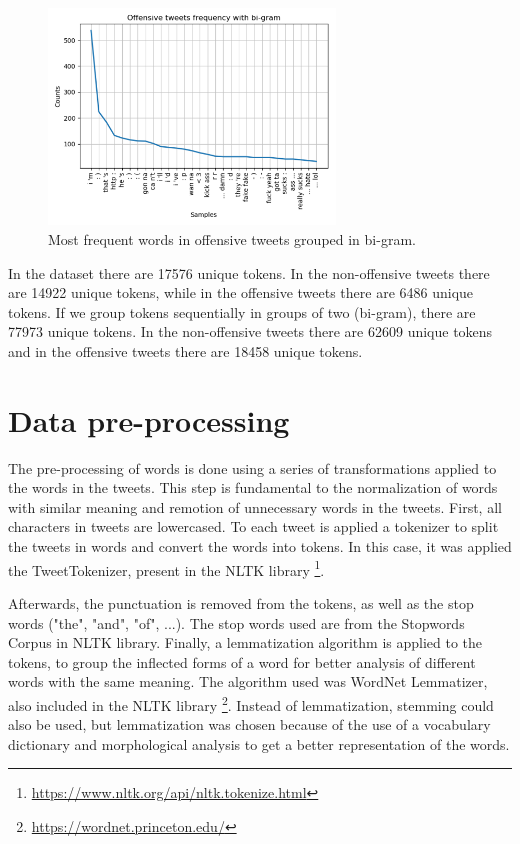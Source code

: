 \documentclass[journal]{IEEEtran}
\begin{document}
\begin{figure}[!t]
\centering
\includegraphics[width=3in]{offensive_tweets_bigram}
\caption{Most frequent words in offensive tweets grouped in bi-gram.}
\label{off_dataset_bigram}
\end{figure}

In the dataset there are 17576 unique tokens. In the non-offensive tweets there are 14922 unique tokens, while in the offensive tweets there are 6486 unique tokens. If we group tokens sequentially in groups of two (bi-gram), there are 77973 unique tokens. In the non-offensive tweets there are 62609 unique tokens and in the offensive tweets there are 18458 unique tokens.

\section{Data pre-processing}
The pre-processing of words is done using a series of transformations applied to the words in the tweets. This step is fundamental to the normalization of words with similar meaning and remotion of unnecessary words in the tweets. First, all characters in tweets are lowercased. To each tweet is applied a tokenizer to split the tweets in words and convert the words into tokens. In this case, it was applied the TweetTokenizer, present in the NLTK library \footnote{\url{https://www.nltk.org/api/nltk.tokenize.html}}.

Afterwards, the punctuation is removed from the tokens, as well as the stop words ("the", "and", "of", ...). The stop words used are from the Stopwords Corpus in NLTK library. Finally, a lemmatization algorithm is applied to the tokens, to group the inflected forms of a word for better analysis of different words with the same meaning. The algorithm used was WordNet Lemmatizer, also included in the NLTK library \footnote{\url{https://wordnet.princeton.edu/}}. Instead of lemmatization, stemming could also be used, but lemmatization was chosen because of the use of a vocabulary dictionary and morphological analysis to get a better representation of the words.
\end{document}
